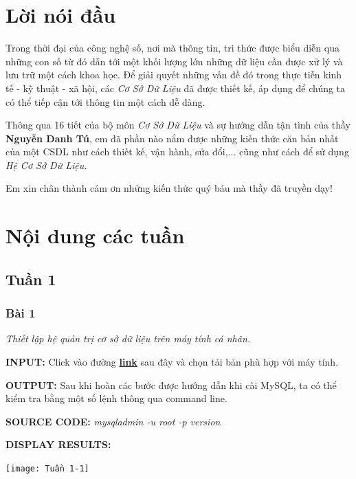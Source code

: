 \documentclass[12pt,a4paper]{report}
\begin{document}
\chapter*{Lời nói đầu}
Trong thời đại của công nghệ số, nơi mà thông tin, tri thức được biểu diễn qua những con số từ đó dẫn tới một khối lượng lớn những dữ liệu cần được xử lý và lưu trữ một cách khoa học. Để giải quyết những vấn đề đó trong thực tiễn kinh tế - kỹ thuật - xã hội, các {\it Cơ Sở Dữ Liệu} đã được thiết kế, áp dụng để chúng ta có thể tiếp cận tới thông tin một cách dễ dàng.

Thông qua 16 tiết của bộ môn {\it Cơ Sở Dữ Liệu} và sự hướng dẫn tận tình của thầy {\bf Nguyễn Danh Tú}, em đã phần nào nắm được những kiến thức căn bản nhất của một CSDL như cách thiết kế, vận hành, sửa đổi,... cũng như cách để sử dụng {\it Hệ Cơ Sở Dữ Liệu.}

Em xin chân thành cảm ơn những kiến thức quý báu mà thầy đã truyền dạy! 


\tableofcontents	                        %


\chapter{Nội dung các tuần}         %
\newpage
\section{Tuần 1}
\subsection{Bài 1}
	\begin{center}
		{\it Thiết lập hệ quản trị cơ sở dữ liệu trên máy tính cá nhân.}
	\end{center}

	{\bf INPUT:} 
		Click vào đường \href{https://dev.mysql.com/downloads/installer/?fbclid=IwAR33jr0G_OOu_5pMoO9CV13o8TjdIwx_QxqX6UqMlQFssRO6RyXwyPhWJt8}{\bf link} sau đây và chọn tải bản phù hợp với máy tính.
		
	{\bf OUTPUT:}
		Sau khi hoàn các bước được hướng dẫn khi cài MySQL, ta có thể kiểm tra bằng một số lệnh thông qua command line.
	
	{\bf SOURCE CODE:}
		{\it mysqladmin -u root -p version}
		
	{\bf DISPLAY RESULTS:}
		\vskip 0.2cm
		\begin{center}
			\texttt{[image: Tuần 1-1]}
		\end{center}
\end{document}
